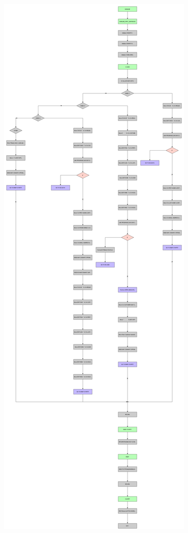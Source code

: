 \begin{figure}[h]
 \centering
   \includegraphics[scale=0.097]{images/anhang/ibmad_flowChart.pdf}
\end{figure}